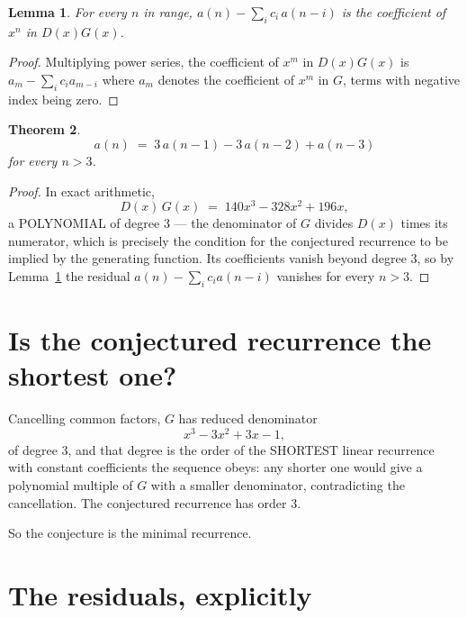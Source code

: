 \documentclass[11pt,a4paper]{article}
\theoremstyle{plain}
\newtheorem{theorem}{Theorem}
\newtheorem{lemma}[theorem]{Lemma}
\theoremstyle{definition}
\begin{document}
\begin{lemma}\label{lem:key}
For every $n$ in range, $a(n)-\sum_i c_i\,a(n-i)$ is the coefficient of $x^{n}$ in
$D(x)G(x)$.
\end{lemma}

\begin{proof}
Multiplying power series, the coefficient of $x^{m}$ in $D(x)G(x)$ is
$a_m-\sum_i c_i a_{m-i}$ where $a_m$ denotes the coefficient of $x^{m}$ in $G$, terms with
negative index being zero.
\end{proof}

\begin{theorem}
\[
a(n)\;=\;3\,a(n-1) - 3\,a(n-2) + a(n-3)
\]
for every $n>3$.
\end{theorem}

\begin{proof}
In exact arithmetic,
\[
D(x)\,G(x)\;=\;140 x^{3} - 328 x^{2} + 196 x,
\]
a POLYNOMIAL of degree $3$ --- the denominator of $G$ divides $D(x)$ times its numerator,
which is precisely the condition for the conjectured recurrence to be implied by the
generating function. Its coefficients vanish beyond degree $3$, so by
Lemma~\ref{lem:key} the residual $a(n)-\sum_ic_ia(n-i)$ vanishes for every
$n>3$.
\end{proof}

\section{Is the conjectured recurrence the shortest one?}

Cancelling common factors, $G$ has reduced denominator
\[
x^{3} - 3 x^{2} + 3 x - 1,
\]
of degree $3$, and that degree is the order of the SHORTEST linear recurrence with
constant coefficients the sequence obeys: any shorter one would give a polynomial multiple of
$G$ with a smaller denominator, contradicting the cancellation. The conjectured recurrence has
order $3$.

So the conjecture is the minimal recurrence.

\section{The residuals, explicitly}
\end{document}
